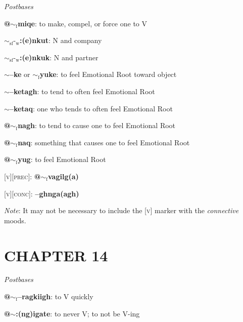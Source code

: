 \documentclass{article}
\begin{document}
\textit{Postbases}
\begin{description}
\item \textbf{@$\sim_\text{f}$miqe}: to make, compel, or force one to V
\item \textbf{$\sim_\text{sf}\text{-}_\text{w}$:(e)nkut}: N and company
\item \textbf{$\sim_\text{sf}\text{-}_\text{w}$:(e)nkuk}: N and partner
\item \textbf{$\sim$--ke} or \textbf{$\sim_\text{f}$yuke}: to feel Emotional Root toward object
\item \textbf{$\sim$--ketagh}: to tend to often feel Emotional Root
\item \textbf{$\sim$--ketaq}: one who tends to often feel Emotional Root
\item \textbf{@$\sim_\text{f}$nagh}: to tend to cause one to feel Emotional Root
\item \textbf{@$\sim_\text{f}$naq}: something that causes one to feel Emotional Root
\item \textbf{@$\sim_\text{f}$yug}: to feel Emotional Root
\end{description}

\bigskip

\textsc{[v][prec]}: \textbf{@$\sim_\text{f}$vagilg(a)}

\bigskip

\textsc{[v][conc]}: \textbf{--ghnga(agh)}

\textit{Note}: It may not be necessary to include the \textsc{[v]} marker with the \textit{connective} moods.


\section{CHAPTER 14}

\textit{Postbases}
\begin{description}
\item \textbf{@$\sim_\text{f}$--ragkiigh}: to V quickly
\item \textbf{@$\sim$:(ng)igate}: to never V; to not be V-ing
\end{description}

\bigskip
\end{document}
